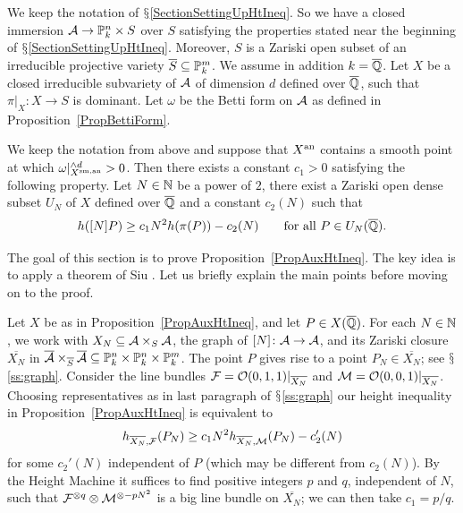 
We keep the notation of $\mathsection$\ref{SectionSettingUpHtIneq}. 
So we have a closed immersion $\mathcal{A}\rightarrow {\mathbb{P}}_k^n\times
S$ over $S$ satisfying the properties stated near the beginning 
of $\mathsection$\ref{SectionSettingUpHtIneq}. Moreover, $S$ is a
Zariski open subset of an irreducible projective variety $\overline
S\subseteq{\mathbb{P}}_k^m$. 
We assume in addition $k = {\overline{\mathbb{Q}}}$. Let $X$ be a closed irreducible subvariety of $\mathcal{A}$ of dimension $d$ defined over ${\overline{\mathbb{Q}}}$, such that $\pi|_X \colon X\rightarrow S$ is dominant. Let $\omega$ be the Betti form on $\mathcal{A}$ as defined in Proposition~\ref{PropBettiForm}.
\begin{proposition}\label{PropAuxHtIneq}
We keep the notation from above and
suppose that ${X}^{\mathrm{an}}$ contains a smooth point at which
$\omega|_{{X}^{\mathrm{sm,an}}}^{\wedge d} >0$. Then there exists a constant $c_1
> 0$ satisfying the following property.
Let $N \in {\mathbb{N}}$ be a power of $2$, there exist a Zariski open dense subset $U_N$ of $X$ defined over ${\overline{\mathbb{Q}}}$ and a constant $c_2(N)$ such that
\[
h([N]P) \ge c_1 N^2 h(\pi(P)) - c_2(N)\qquad \text{for all }P \in U_N({\overline{\mathbb{Q}}}).
\]
\end{proposition}

The goal of this section is to prove Proposition~\ref{PropAuxHtIneq}. 
The key idea is to apply a theorem of Siu \cite[Theorem~2.2.15]{PosAlgGeom}. Let us briefly explain the main points before moving on to the proof.

Let $X$ be as in Proposition~\ref{PropAuxHtIneq}, and let $P \in
X({\overline{\mathbb{Q}}})$. For each $N \in {\mathbb{N}}$, we work with $X_N \subseteq
\mathcal{A}\times_S \mathcal{A}$, the graph of $[N] \colon \mathcal{A} \rightarrow \mathcal{A}$, and
its Zariski closure $\overline{X_N}$ in
$\overline{\mathcal{A}}\times_{\overline{S}}\overline{\mathcal{A}} \subseteq {\mathbb{P}}_k^n
\times {\mathbb{P}}_k^n \times {\mathbb{P}}_k^m$. The point $P$ gives rise to a point
$P_N \in \overline{X_N}$; see $\mathsection$\ref{ss:graph}. Consider
the line bundles ${\mathcal F} = {\mathcal O}(0,1,1)|_{\overline{X_N}}$ and ${\mathcal M} =
{\mathcal O}(0,0,1)|_{\overline{X_N}}$. Choosing representatives as in
last paragraph of
$\mathsection$\ref{ss:graph}  
 our height inequality in Proposition~\ref{PropAuxHtIneq} is equivalent to
\[
h_{\overline{X_N},{\mathcal F}}(P_N)\ge c_1 N^2 h_{\overline{X_N},{\mathcal M}}(P_N) - c_2'(N)
\]
for some $c_2'(N)$ independent of $P$ (which may be different from
$c_2(N)$). By the Height Machine  it suffices to find positive
integers $p$ and $q$, independent of $N$, such that ${\mathcal F}^{\otimes q}
\otimes {\mathcal M}^{\otimes -p N^2}$ is a big line bundle on
$\overline{X_N}$; we can then take $c_1=p/q$. 

